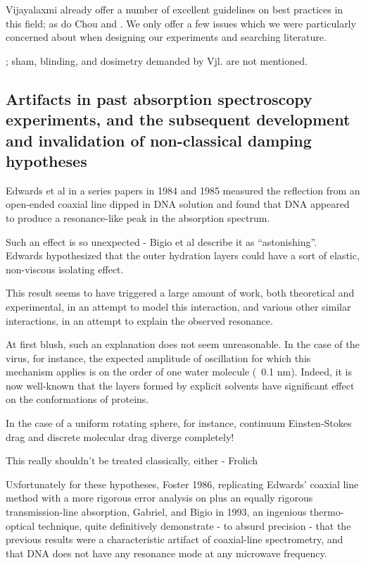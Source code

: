 \documentclass[paper.tex]{subfiles}
\begin{document}
\begin{multicols}{1}

Vijayalaxmi \cite{Biological2016} \cite{Comprehensive2018} \cite{Funding2019} already offer a number of excellent guidelines on best practices in this field; as do Chou \cite{chou1996radio} and \cite{Effects2016} . We only offer a few issues which we were particularly concerned about when designing our experiments and searching literature. 

; sham, blinding, and dosimetry demanded by Vjl. are not mentioned.


\subsection{Artifacts in past absorption spectroscopy experiments, and the subsequent development and invalidation of non-classical damping hypotheses}

Edwards et al in a series papers in 1984 and 1985 measured the reflection from an open-ended coaxial line dipped in DNA solution and found that DNA appeared to produce a resonance-like peak in the absorption spectrum.

Such an effect is so unexpected - Bigio et al describe it as “astonishing”. \\

Edwards hypothesized that the outer hydration layers could have a sort of elastic, non-viscous isolating effect.

This result seems to have triggered a large amount of work, both theoretical and experimental\cite{Structure1989}, in an attempt to model this interaction, and various other similar interactions, in an attempt to explain the observed resonance.

At first blush, such an explanation does not seem unreasonable. In the case of the virus, for instance, the expected amplitude of oscillation for which this mechanism applies is on the order of one water molecule (~0.1 nm). Indeed, it is now well-known that the layers formed by explicit solvents have significant effect on the conformations of proteins.

In the case of a uniform rotating sphere\cite{Molecular1963}, for instance, continuum Einsten-Stokes drag and discrete molecular drag diverge completely!

This really shouldn’t be treated classically, either - Frolich 

\lettrine{U}nfortunately for these hypotheses, Foster 1986, replicating Edwards’ coaxial line method with a more rigorous error analysis on plus an equally rigorous transmission-line absorption, Gabriel, and Bigio in 1993, an ingenious thermo-optical technique, quite definitively demonstrate - to absurd precision -  that the previous results were a characteristic artifact of coaxial-line spectrometry, and that DNA does not have any resonance mode at any microwave frequency.


\end{multicols}
\end{document}
